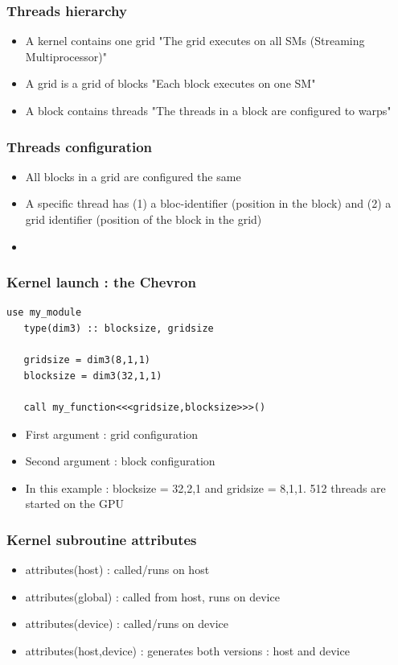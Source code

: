 \begin{frame}[containsverbatim]
	\frametitle{Threads hierarchy}
	\begin{itemize}
	\item {A kernel contains one grid "The grid executes on all SMs (Streaming Multiprocessor)"}
	\item {A grid is a grid of blocks "Each block executes on one SM"}
	\item {A block contains threads "The threads in a block are configured to warps"}
	\end{itemize}
\end{frame}

\begin{frame}[containsverbatim]
	\frametitle{Threads configuration}
	\begin{itemize}
	\item {All blocks in a grid are configured the same}
	\item {A specific thread has (1) a bloc-identifier (position in the block) and (2) a grid identifier (position of the block in the grid)}
	\item {}
	\end{itemize}
\end{frame}


\begin{frame}[containsverbatim]
	\frametitle{Kernel launch : the Chevron}

\begin{lstlisting}[language=FORTRAN,frame=lines]
   use my_module
   type(dim3) :: blocksize, gridsize
   
   gridsize = dim3(8,1,1)
   blocksize = dim3(32,1,1)

   call my_function<<<gridsize,blocksize>>>()
\end{lstlisting}
	\begin{itemize}
	\item {First argument : grid configuration}
	\item {Second argument : block configuration}
	\item {In this example : blocksize = 32,2,1 and gridsize = 8,1,1. 512 threads are started on the GPU}
	\end{itemize}
\end{frame}


\begin{frame}[containsverbatim]
	\frametitle{Kernel subroutine attributes}
	\begin{itemize}
	\item {attributes(host) : called/runs on host}
	\item {attributes(global) : called from host, runs on device}
	\item {attributes(device) : called/runs on device}
	\item {attributes(host,device) : generates both versions : host and device}
	\end{itemize}
\end{frame}



